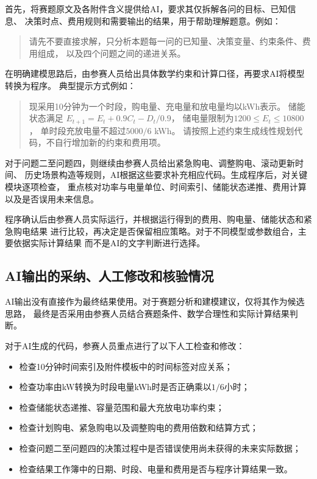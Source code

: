 \documentclass[withoutpreface,bwprint]{cumcmthesis}
\begin{document}
首先，将赛题原文及各附件含义提供给AI，要求其仅拆解各问的目标、已知信息、
决策时点、费用规则和需要输出的结果，用于帮助理解题意。例如：

\begin{quote}
请先不要直接求解，只分析本题每一问的已知量、决策变量、约束条件、费用组成，
以及四个问题之间的递进关系。
\end{quote}

在明确建模思路后，由参赛人员给出具体数学约束和计算口径，再要求AI将模型转换为程序。
典型提示方式例如：

\begin{quote}
现采用10分钟为一个时段，购电量、充电量和放电量均以kWh表示。
储能状态满足
$E_{t+1}=E_t+0.9C_t-D_t/0.9$，
储电量限制为$1200\leq E_t\leq10800$，
单时段充放电量不超过$5000/6$ kWh。
请按照上述约束生成线性规划代码，不自行增加新的约束和费用项。
\end{quote}

对于问题二至问题四，则继续由参赛人员给出紧急购电、调整购电、滚动更新时间、
历史场景构造等规则，AI根据这些要求补充相应代码。生成程序后，对关键模块逐项检查，
重点核对功率与电量单位、时间索引、储能状态递推、费用计算以及是否误用未来信息。

程序确认后由参赛人员实际运行，并根据运行得到的费用、购电量、储能状态和紧急购电结果
进行比较，再决定是否保留相应策略。对于不同模型或参数组合，主要依据实际计算结果
而不是AI的文字判断进行选择。

\subsection{AI输出的采纳、人工修改和核验情况}

AI输出没有直接作为最终结果使用。对于赛题分析和建模建议，仅将其作为候选思路，
最终是否采用由参赛人员结合赛题条件、数学合理性和实际计算结果判断。

对于AI生成的代码，参赛人员重点进行了以下人工检查和修改：

\begin{itemize}
    \item 检查10分钟时间索引及附件模板中的时间标签对应关系；
    \item 检查功率由kW转换为时段电量kWh时是否正确乘以$1/6$小时；
    \item 检查储能状态递推、容量范围和最大充放电功率约束；
    \item 检查计划购电、紧急购电以及调整购电的费用倍数和结算方式；
    \item 检查问题二至问题四的决策过程中是否错误使用尚未获得的未来实际数据；
    \item 检查结果工作簿中的日期、时段、电量和费用是否与程序计算结果一致。
\end{itemize}
\end{document}
